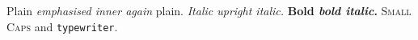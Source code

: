 \documentclass{article}
\begin{document}
Plain \emph{emphasised \emph{inner} again} plain. \textit{Italic \emph{upright} italic.}
\textbf{Bold \emph{bold italic}.} \textsc{Small Caps} and \texttt{typewriter}.
\end{document}
